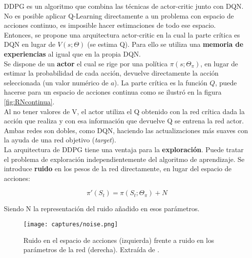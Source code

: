 \documentclass[11pt,fleqn]{book} %
\begin{document}
DDPG \cite{article:DDPG} \cite{article:DDPG_2} es un algoritmo que combina las técnicas de actor-critic junto con DQN. No es posible aplicar Q-Learning directamente a un problema con espacio de acciones continuo, es imposible hacer estimaciones de todo ese espacio. \\

Entonces, se propone una arquitectura actor-critic en la cual la parte crítica es DQN en lugar de $V(s;\Theta)$ (se estima Q). Para ello se utiliza una \textbf{memoria de experiencias} al igual que en la propia DQN. \\

Se dispone de un \textbf{actor} el cual se rige por una política $\pi(s;\Theta_\pi)$, en lugar de estimar la probabilidad de cada acción, devuelve directamente la acción seleccionada (un valor numérico de $a$). La parte crítica es la función $Q$, puede hacerse para un espacio de acciones continua como se ilustró en la figura \ref{fig:RNcontinua}. \\

Al no tener valores de V, el actor utiliza el Q obtenido con la red crítica dada la acción que realiza y con esa información que devuelve Q se entrena la red actor. Ambas redes son dobles, como DQN, haciendo las actualizaciones más suaves con la ayuda de una red objetivo (\textit{target}).\\

La arquitectura de DDPG tiene una ventaja para la \textbf{exploración}. Puede tratar el problema de exploración independientemente del algoritmo de aprendizaje. Se introduce \textbf{ruido} en los pesos de la red directamente, en lugar del espacio de acciones:

\begin{equation}
\pi'(S_t)=\pi(S_t;\Theta_\pi)+N
\end{equation}

Siendo N la representación del ruido añadido en esos parámetros.\\

\begin{figure}[H]
	\centering\texttt{[image: captures/noise.png]}
	\caption{Ruido en el espacio de acciones (izquierda) frente a ruido en los parámetros de la red (derecha). Extraída de \cite{article:DDPG_2}.}
	\label{fig:noise} %
\end{figure}
\end{document}
